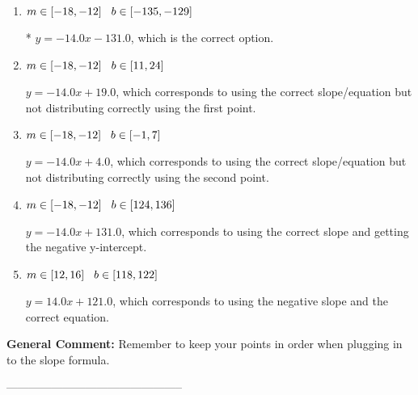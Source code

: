 \documentclass{extbook}[14pt]
\begin{document}
\begin{enumerate}[label=\Alph*.] 
\item $ m \in [-18, -12] \hspace*{3mm} b \in [-135, -129] $ 

 * $y = -14.0x -131.0$, which is the correct option. 
\item $ m \in [-18, -12] \hspace*{3mm} b \in [11, 24] $ 

  $y = -14.0x + 19.0$, which corresponds to using the correct slope/equation but not distributing correctly using the first point. 
\item $ m \in [-18, -12] \hspace*{3mm} b \in [-1, 7] $ 

  $y = -14.0x + 4.0$, which corresponds to using the correct slope/equation but not distributing correctly using the second point. 
\item $ m \in [-18, -12] \hspace*{3mm} b \in [124, 136] $ 

  $y = -14.0x + 131.0$, which corresponds to using the correct slope and getting the negative y-intercept. 
\item $ m \in [12, 16] \hspace*{3mm} b \in [118, 122] $ 

  $y = 14.0x + 121.0$, which corresponds to using the negative slope and the correct equation. 
\end{enumerate} 
 
\textbf{General Comment:} Remember to keep your points in order when plugging in to the slope formula. 

-----------------------------------------------
\end{document}
